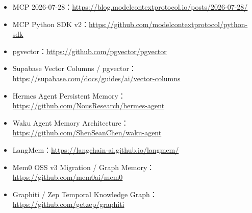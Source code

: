 \documentclass[profile=standard,twoside=false]{ipara-handbook}
\begin{document}
\begin{itemize}
  \item MCP 2026-07-28：\url{https://blog.modelcontextprotocol.io/posts/2026-07-28/}
  \item MCP Python SDK v2：\url{https://github.com/modelcontextprotocol/python-sdk}
  \item pgvector：\url{https://github.com/pgvector/pgvector}
  \item Supabase Vector Columns / pgvector：\url{https://supabase.com/docs/guides/ai/vector-columns}
  \item Hermes Agent Persistent Memory：\url{https://github.com/NousResearch/hermes-agent}
  \item Waku Agent Memory Architecture：\url{https://github.com/ShenSeanChen/waku-agent}
  \item LangMem：\url{https://langchain-ai.github.io/langmem/}
  \item Mem0 OSS v3 Migration / Graph Memory：\url{https://github.com/mem0ai/mem0}
  \item Graphiti / Zep Temporal Knowledge Graph：\url{https://github.com/getzep/graphiti}
\end{itemize}
\end{document}
